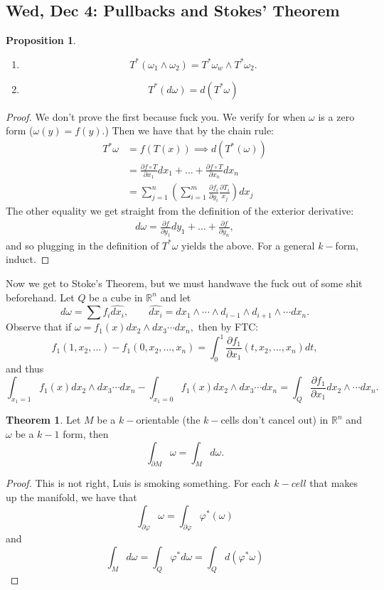 \documentclass[10pt, oneside]{article}
\newcommand{\bbR}{\mathbb{R}}
\theoremstyle{definition}
\newtheorem{thm}{Theorem}
\newtheorem{prop}{Proposition}
\begin{document}
\subsection{Wed, Dec 4: Pullbacks and Stokes' Theorem}
\begin{prop}
\begin{enumerate}
    \item \[T^\ast(\omega_1 \wedge \omega_2) = T^\ast\omega_w \wedge T^\ast \omega_2.\]
    \item 
    \[T^\ast(d\omega) = d(T^\ast \omega)\]
\end{enumerate}
\end{prop}
\begin{proof}
    We don't prove the first because fuck you. We verify for when $\omega$ is a zero form ($\omega(y) = f(y)$.) Then we have that by the chain rule:
    \begin{align*}
      T^\ast \omega &= f(T(x)) \implies d(T^\ast(\omega))\\
      &= \frac{\partial f \circ T}{\partial x_1}dx_1 + \dots + \frac{\partial f \circ T}{\partial x_n}dx_n\\
      &= \sum_{j=1}^n\left(\sum_{i=1}^m\frac{\partial f_i}{\partial y_i}\frac{\partial T_i}{x_j}\right)dx_j
    \end{align*}
    The other equality we get straight from the definition of the exterior derivative:
    \begin{align*}
        d\omega = \frac{\partial f}{\partial y_1}dy_1 + \dots + \frac{\partial f}{\partial y_n},
    \end{align*}
    and so plugging in the definition of $T^\ast \omega$ yields the above. For a general $k-$form, induct.
\end{proof}
Now we get to Stoke's Theorem, but we must handwave the fuck out of some shit beforehand. Let $Q$ be a cube in $\bbR^n$ and let 
\[d\omega = \sum f_i \hat{dx_i}, \qquad \hat{dx_i} = dx_1 \wedge \cdots \wedge d_{i-1}\wedge d_{i+1}\wedge \cdots dx_n.\]
    Observe that if $\omega = f_1(x)dx_2 \wedge dx_3 \cdots dx_n,$ then by FTC:
    \[f_1(1, x_2, \dots) - f_1(0, x_2, \dots, x_n) = \int_0^1 \frac{\partial f_1}{\partial x_1}(t, x_2, \dots, x_n)dt,\] and thus 
    \[\int_{x_1 = 1}f_1(x)dx_2 \wedge dx_3 \cdots dx_n - \int_{x_1 = 0}f_1(x)dx_2 \wedge dx_3 \cdots dx_n = \int_Q \frac{\partial f_1}{\partial x_1}dx_2 \wedge \cdots dx_n.\]
\begin{thm}
    Let $M$ be a $k-$orientable (the $k-$cells don't cancel out) in $\bbR^n$ and $\omega$ be a $k-1$ form, then 
    \[\int_{\partial M} \omega = \int_M d\omega.\]
\end{thm}
\begin{proof}
This is not right, Luis is smoking something.
    For each $k-cell$ that makes up the manifold, we have that 
    \[\int_{\partial \varphi}\omega = \int_{\partial \varphi} \varphi^\ast(\omega)\] and 
    \[\int_M d\omega = \int_Q \varphi^\ast d\omega = \int_Q d(\varphi^\ast \omega)\]
\end{proof}
\newpage
\end{document}
